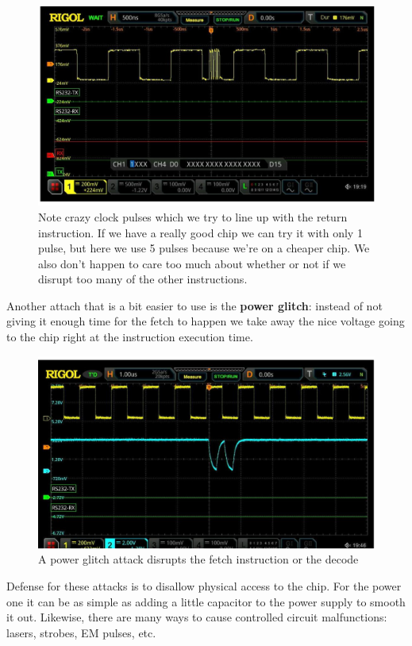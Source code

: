 \documentclass[../notes.tex]{subfiles}
\begin{document}
\begin{figure}[H]
    \centering
    \includegraphics[width=0.8\linewidth]{img/image_2023-01-23-19-53-10.png}
    \caption{Note crazy clock pulses which we try to line up with the return instruction. If we have a really good chip we can try it with only 1 pulse, but here we use 5 pulses because we're on a cheaper chip. We also don't happen to care too much about whether or not if we disrupt too many of the other instructions.}
\end{figure}



Another attach that is a bit easier to use is the \textbf{power glitch}: instead of not giving it enough time for the fetch to happen we take away the nice voltage going to the chip right at the instruction execution time. 

\begin{figure}[H]
    \centering
    \includegraphics[width=0.8\linewidth]{img/image_2023-01-23-19-59-04.png}
    \caption{A power glitch attack disrupts the fetch instruction or the decode}
\end{figure}

Defense for these attacks is to disallow physical access to the chip. For the power one it can be as simple as adding a little capacitor to the power supply to smooth it out.
Likewise, there are many ways to cause controlled circuit malfunctions: lasers, strobes, EM pulses, etc.
\end{document}

